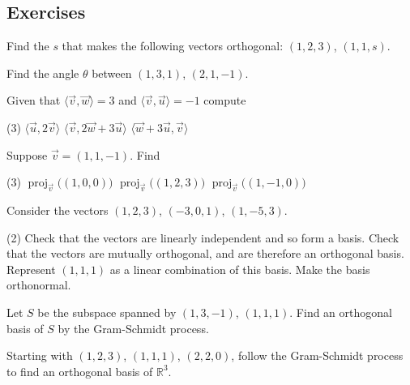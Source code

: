 \subsection{Exercises}

\begin{exercise}
Find the $s$ that makes the following vectors orthogonal:
$(1,2,3)$, $(1,1,s)$.
\end{exercise}

\begin{exercise}
Find the angle $\theta$ between
$(1,3,1)$, $(2,1,-1)$.
\end{exercise}

\begin{exercise}
Given that $\langle \vec{v} , \vec{w} \rangle = 3$ and
$\langle \vec{v} , \vec{u} \rangle = -1$ compute
\begin{tasks}(3)
\task $\langle \vec{u} , 2 \vec{v} \rangle$
\task $\langle \vec{v} , 2 \vec{w} + 3 \vec{u} \rangle$
\task $\langle \vec{w} + 3 \vec{u}, \vec{v} \rangle$
\end{tasks}
\end{exercise}

\begin{exercise}
Suppose $\vec{v} = (1,1,-1)$.  Find
\begin{tasks}(3)
\task $\operatorname{proj}_{\vec{v}}\bigl( (1,0,0) \bigr)$
\task $\operatorname{proj}_{\vec{v}}\bigl( (1,2,3) \bigr)$
\task $\operatorname{proj}_{\vec{v}}\bigl( (1,-1,0) \bigr)$
\end{tasks}
\end{exercise}

\begin{exercise}
\pagebreak[2]
Consider the vectors $(1,2,3)$, $(-3,0,1)$, $(1,-5,3)$.
\begin{tasks}(2)
\task Check that the vectors are linearly independent and so form a basis.
\task Check that the vectors are mutually orthogonal, and are therefore
an orthogonal basis.
\task Represent $(1,1,1)$ as a linear combination of this basis.
\task Make the basis orthonormal.
\end{tasks}
\end{exercise}

\begin{exercise}
Let $S$ be the subspace spanned by
$(1,3,-1)$, $(1,1,1)$.  Find an orthogonal basis of $S$
by the Gram-Schmidt process.
\end{exercise}

\begin{exercise}
Starting with $(1,2,3)$, $(1,1,1)$, $(2,2,0)$, follow the Gram-Schmidt
process to find an orthogonal basis of ${\mathbb{R}}^3$.
\end{exercise}

